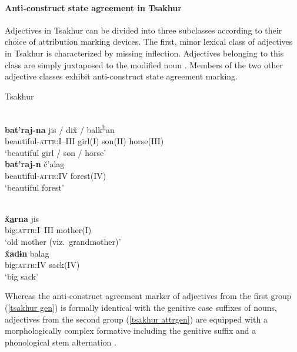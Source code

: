 \paragraph*{Anti\hyp{}construct state agreement in Tsakhur}
Adjectives in Tsakhur can be divided into three subclasses according to their choice of attribution marking devices. The first, minor lexical class of adjectives in Tsakhur is characterized by missing inflection. Adjectives belonging to this class are simply juxtaposed to the modified noun \citep[383]{talibov2004}. Members of the two other adjective classes exhibit anti\hyp{}construct state agreement marking.
\begin{exe}
\ex 
{\rm Tsakhur \citep[382]{talibov2004}}
\begin{xlist}
\ex	
\label{tsakhur gen}
\begin{xlist}
\\
\gll	\textbf{bat'raj-na} jis / dix̌ / balk\textsuperscript{h}an\\
	 beautiful-\textsc{attr:I–III} girl(\textsc{I}) { } son(\textsc{II}) { } horse(\textsc{III})\\
\glt	 ‘beautiful girl / son / horse’
\\
\gll	\textbf{bat'raj-n}	č'alag\\
	beautiful-\textsc{attr:IV} forest(\textsc{IV})\\
\glt	‘beautiful forest’
\end{xlist}
\ex 
\label{tsakhur attrgen}
\begin{xlist}
\\
\gll	\textbf{x̌\underline{a}rna} jis\\
	big:\textsc{attr:I–III} mother(\textsc{I})\\
\glt	‘old mother (viz.~grandmother)’
\\
\gll	\textbf{x̌adɨn} balag\\
	big:\textsc{attr:IV} sack(\textsc{IV})\\
\glt	‘big sack’
\end{xlist}
\end{xlist}
\end{exe}
Whereas the anti\hyp{}construct agreement marker of adjectives from the first group (\ref{tsakhur gen}) is formally identical with the genitive case suffixes of nouns, adjectives from the second group (\ref{tsakhur attrgen}) are equipped with a morphologically complex formative including the genitive suffix and a phonological stem alternation \citep[382]{talibov2004}.

